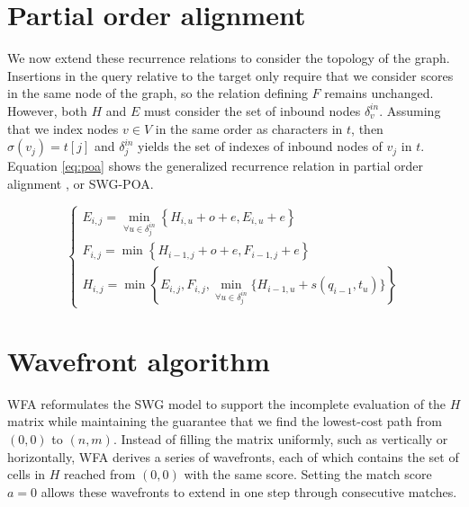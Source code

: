 \documentclass[10pt]{article}         %
\begin{document}
\section{Partial order alignment}

We now extend these recurrence relations to consider the topology of the graph.
Insertions in the query relative to the target only require that we consider scores in the same node of the graph, so the relation defining $F$ remains unchanged.
However, both $H$ and $E$ must consider the set of inbound nodes $\delta_v^{in}$.
Assuming that we index nodes $v \in V$ in the same order as characters in $t$, then $\sigma(v_j) = t[j]$ and $\delta_j^{in}$ yields the set of indexes of inbound nodes of $v_j$ in $t$.
Equation \ref{eq:poa} shows the generalized recurrence relation in partial order alignment \cite{Lee_2002}, or SWG-POA\@.

\begin{equation}
  \left\{\begin{array}{l}
  E_{i, j}=\min_{\forall u \in \delta_j^{in}} \left\{H_{i, u}+o+e, E_{i, u}+e\right\} \\
  F_{i, j}=\min \left\{H_{i-1, j}+o+e, F_{i-1, j}+e\right\} \\
  H_{i, j}=\min \left\{E_{i, j}, F_{i, j}, \min_{\forall u \in \delta_j^{in}} \{ H_{i-1, u}+s\left(q_{i-1}, t_{u}\right)\}\right\}
  \end{array}\right.
  \label{eq:poa}
\end{equation}

\section{Wavefront algorithm}

WFA reformulates the SWG model to support the incomplete evaluation of the $H$ matrix while maintaining the guarantee that we find the lowest-cost path from $(0,0)$ to $(n,m)$.
Instead of filling the matrix uniformly, such as vertically or horizontally, WFA derives a series of wavefronts, each of which contains the set of cells in $H$ reached from $(0,0)$ with the same score.
Setting the match score $a = 0$ allows these wavefronts to extend in one step through consecutive matches.
\end{document}
